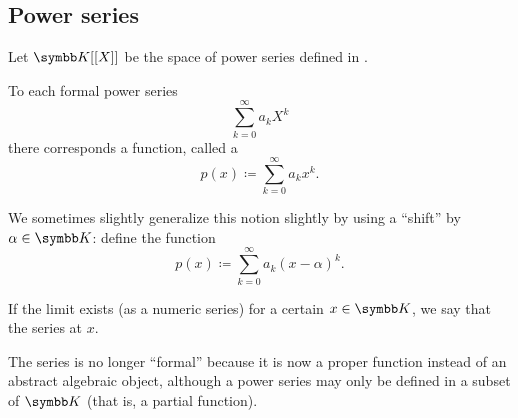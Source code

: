 \subsection{Power series}\label{subsec:power_series}

\begin{definition}\label{def:convergent_power_series}
  Let \( \BK[[X]] \) be the space of power series defined in .

  To each formal power series
  \begin{equation*}
    \sum_{k=0}^\infty a_k X^k
  \end{equation*}
  there corresponds a function, called a 
  \begin{equation}\label{def:convergent_power_series/series}
    p(x) \coloneqq \sum_{k=0}^\infty a_k x^k.
  \end{equation}

  We sometimes slightly generalize this notion slightly by using a \enquote{shift} by \( \alpha \in \BK \): define the function
  \begin{equation}\label{def:convergent_power_series/shifted_series}
    p(x) \coloneqq \sum_{k=0}^\infty a_k (x - \alpha)^k.
  \end{equation}

  If the limit exists (as a numeric series) for a certain \( x \in \BK \), we say that the series  at \( x \).

  The series is no longer \enquote{formal} because it is now a proper function instead of an abstract algebraic object, although a power series may only be defined in a subset of \( \BK \) (that is, a partial function).
\end{definition}


